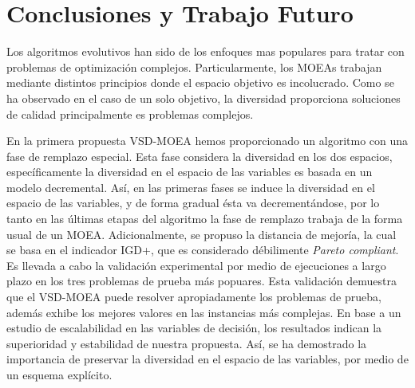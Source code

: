 


\chapter{Conclusiones y Trabajo Futuro} %

\label{Chapter7} %

Los algoritmos evolutivos han sido de los enfoques mas populares para tratar con problemas de optimización complejos.
%
Particularmente, los MOEAs trabajan mediante distintos principios donde el espacio objetivo es incolucrado.
%
Como se ha observado en el caso de un solo objetivo, la diversidad proporciona soluciones de calidad principalmente es problemas complejos.
%

En la primera propuesta VSD-MOEA hemos proporcionado un algoritmo con una fase de remplazo especial.
%
Esta fase considera la diversidad en los dos espacios, específicamente la diversidad en el espacio de las variables es basada en un modelo decremental.
%
Así, en las primeras fases se induce la diversidad en el espacio de las variables, y de forma gradual ésta va decrementándose, por lo tanto en las últimas etapas del algoritmo la fase de remplazo trabaja de la forma usual de un MOEA.
%
Adicionalmente, se propuso la distancia de mejoría, la cual se basa en el indicador IGD+, que es considerado débilimente \textit{Pareto compliant}.
%
Es llevada a cabo la validación experimental por medio de ejecuciones a largo plazo en los tres problemas de prueba más popuares.
%
Esta validación demuestra que el VSD-MOEA puede resolver apropiadamente los problemas de prueba, además exhibe los mejores valores en las instancias más complejas.
%
En base a un estudio de escalabilidad en las variables de decisión, los resultados indican la superioridad y estabilidad de nuestra propuesta.
%
Así, se ha demostrado la importancia de preservar la diversidad en el espacio de las variables, por medio de un esquema explícito.



